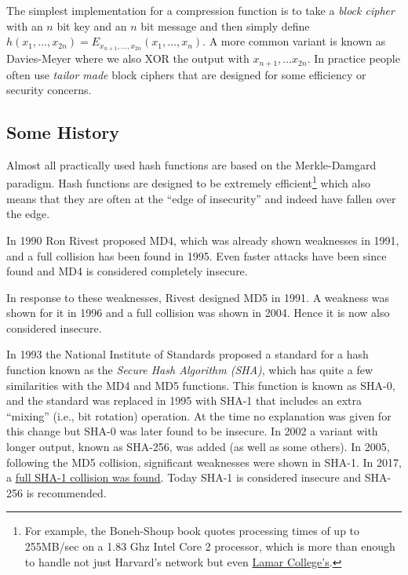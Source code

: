 The simplest implementation for a compression function is to take a
\emph{block cipher} with an \(n\) bit key and an \(n\) bit message and
then simply define
\(h(x_1,\ldots,x_{2n})=E_{x_{n+1},\ldots,x_{2n}}(x_{1},\ldots,x_{n})\).
A more common variant is known as Davies-Meyer where we also XOR the
output with \(x_{n+1},\ldots x_{2n}\). In practice people often use
\emph{tailor made} block ciphers that are designed for some efficiency
or security concerns.

\subsection{Some History}\label{Some-History}

Almost all practically used hash functions are based on the
Merkle-Damgard paradigm. Hash functions are designed to be extremely
efficient\footnote{For example, the Boneh-Shoup book quotes processing
  times of up to 255MB/sec on a 1.83 Ghz Intel Core 2 processor, which
  is more than enough to handle not just Harvard's network but even
  \href{http://www.huffingtonpost.com/2014/06/27/colleges-fastest-internet-speed-infographic_n_5536834.html}{Lamar
  College's}.} which also means that they are often at the ``edge of
insecurity'' and indeed have fallen over the edge.

In 1990 Ron Rivest proposed MD4, which was already shown weaknesses in
1991, and a full collision has been found in 1995. Even faster attacks
have been since found and MD4 is considered completely insecure.

In response to these weaknesses, Rivest designed MD5 in 1991. A weakness
was shown for it in 1996 and a full collision was shown in 2004. Hence
it is now also considered insecure.

In 1993 the National Institute of Standards proposed a standard for a
hash function known as the \emph{Secure Hash Algorithm (SHA)}, which has
quite a few similarities with the MD4 and MD5 functions. This function
is known as SHA-0, and the standard was replaced in 1995 with SHA-1 that
includes an extra ``mixing'' (i.e., bit rotation) operation. At the time
no explanation was given for this change but SHA-0 was later found to be
insecure. In 2002 a variant with longer output, known as SHA-256, was
added (as well as some others). In 2005, following the MD5 collision,
significant weaknesses were shown in SHA-1. In 2017, a
\href{https://goo.gl/jdqUX9}{full SHA-1 collision was found}. Today
SHA-1 is considered insecure and SHA-256 is recommended.

